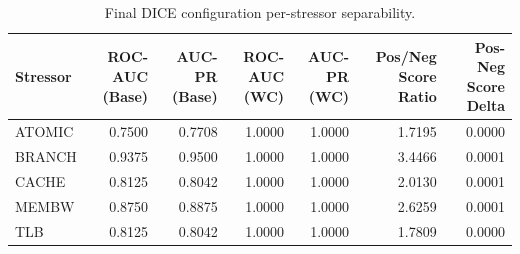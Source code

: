 \begin{table}[t]
\centering
\caption{Final DICE configuration per-stressor separability.}
\label{tab:dice_full_stressor}
\footnotesize
\begin{tabular}{lrrrrrr}
\toprule
Stressor & ROC-AUC (Base) & AUC-PR (Base) & ROC-AUC (WC) & AUC-PR (WC) & Pos/Neg Score Ratio & Pos-Neg Score Delta \\
\midrule
ATOMIC & 0.7500 & 0.7708 & 1.0000 & 1.0000 & 1.7195 & 0.0000 \\
BRANCH & 0.9375 & 0.9500 & 1.0000 & 1.0000 & 3.4466 & 0.0001 \\
CACHE & 0.8125 & 0.8042 & 1.0000 & 1.0000 & 2.0130 & 0.0001 \\
MEMBW & 0.8750 & 0.8875 & 1.0000 & 1.0000 & 2.6259 & 0.0001 \\
TLB & 0.8125 & 0.8042 & 1.0000 & 1.0000 & 1.7809 & 0.0000 \\
\bottomrule
\end{tabular}

\end{table}
